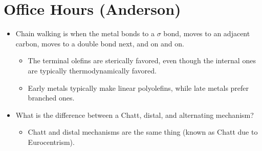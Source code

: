 \documentclass[../notes.tex]{subfiles}
\begin{document}
\section{Office Hours (Anderson)}
\begin{itemize}
    \item Chain walking is when the metal bonds to a $\sigma$ bond, moves to an adjacent carbon, moves to a double bond next, and on and on.
    \begin{itemize}
        \item The terminal olefins are sterically favored, even though the internal ones are typically thermodynamically favored.
        \item Early metals typically make linear polyolefins, while late metals prefer branched ones.
    \end{itemize}
    \item What is the difference between a Chatt, distal, and alternating mechanism?
    \begin{itemize}
        \item Chatt and distal mechanisms are the same thing (known as Chatt due to Eurocentrism).
    \end{itemize}
\end{itemize}
\end{document}
